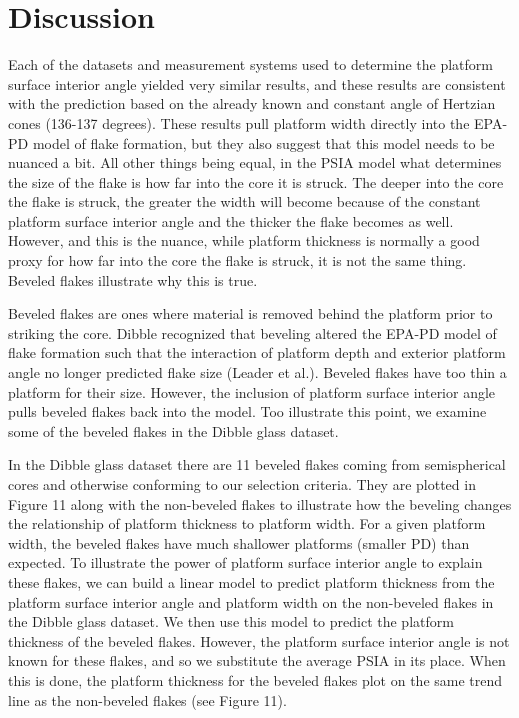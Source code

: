 \documentclass[10pt,letterpaper]{article}
\begin{document}
\hypertarget{discussion}{%
\section{Discussion}\label{discussion}}

Each of the datasets and measurement systems used to determine the
platform surface interior angle yielded very similar results, and these
results are consistent with the prediction based on the already known
and constant angle of Hertzian cones (136-137 degrees). These results
pull platform width directly into the EPA-PD model of flake formation,
but they also suggest that this model needs to be nuanced a bit. All
other things being equal, in the PSIA model what determines the size of
the flake is how far into the core it is struck. The deeper into the
core the flake is struck, the greater the width will become because of
the constant platform surface interior angle and the thicker the flake
becomes as well. However, and this is the nuance, while platform
thickness is normally a good proxy for how far into the core the flake
is struck, it is not the same thing. Beveled flakes illustrate why this
is true.

Beveled flakes are ones where material is removed behind the platform
prior to striking the core. Dibble recognized that beveling altered the
EPA-PD model of flake formation such that the interaction of platform
depth and exterior platform angle no longer predicted flake size (Leader
et al.). Beveled flakes have too thin a platform for their size.
However, the inclusion of platform surface interior angle pulls beveled
flakes back into the model. Too illustrate this point, we examine some
of the beveled flakes in the Dibble glass dataset.

In the Dibble glass dataset there are 11 beveled flakes coming from
semispherical cores and otherwise conforming to our selection criteria.
They are plotted in Figure 11 along with the non-beveled flakes to
illustrate how the beveling changes the relationship of platform
thickness to platform width. For a given platform width, the beveled
flakes have much shallower platforms (smaller PD) than expected. To
illustrate the power of platform surface interior angle to explain these
flakes, we can build a linear model to predict platform thickness from
the platform surface interior angle and platform width on the
non-beveled flakes in the Dibble glass dataset. We then use this model
to predict the platform thickness of the beveled flakes. However, the
platform surface interior angle is not known for these flakes, and so we
substitute the average PSIA in its place. When this is done, the
platform thickness for the beveled flakes plot on the same trend line as
the non-beveled flakes (see Figure 11).
\end{document}

